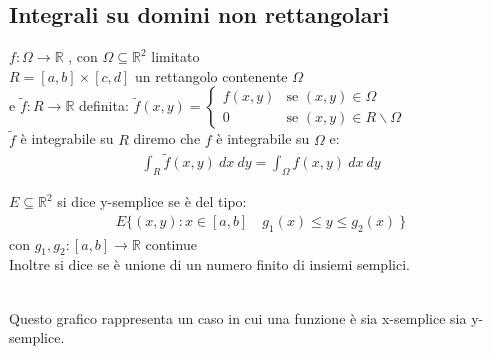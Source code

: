 \documentclass[a4paper, oneside]{article}
\begin{document}
\subsection{Integrali su domini non rettangolari}
\begin{definition}
     $f:\Omega \to \mathbb{R}$ , con $\Omega \subseteq \mathbb{R}^2$ limitato\\
     $R = [a,b] \times [c,d]$ un rettangolo contenente $\Omega$ \\
    e  $\tilde{f}:R \to \mathbb{R}$ definita: $\tilde{f}(x,y) = \begin{cases}
        f(x,y) & \text{se } (x,y) \in \Omega \\
        0 & \text{se } (x,y) \in R \backslash \Omega
    \end{cases}$\\
     $\tilde{f}$ è integrabile su $R$ diremo che $f$ è integrabile su $\Omega$ e:
    \begin{gather*}
        \int_{R} \tilde{f}(x,y) \ dx \ dy = \int_{\Omega} f(x,y) \ dx \ dy
    \end{gather*}
\end{definition}


\begin{definition}
    $E \subseteq \mathbb{R}^2$ si dice y-semplice se è del tipo:
    \begin{gather*}
        E \{ (x,y):x \in [a,b] \quad g_1(x) \leq y \leq g_2(x) \ \}
    \end{gather*} 
    con $g_1,g_2:[a,b] \to \mathbb{R}$ continue\\
    Inoltre si dice  se è unione di un numero finito di insiemi semplici.
\end{definition}


\begin{center}
    \tiny
    \hfill\\
    Questo grafico rappresenta un caso in cui una funzione è sia x-semplice sia y-semplice.
    \normalsize
\end{center}
\end{document}
